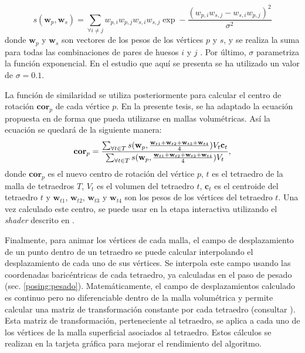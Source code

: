 \begin{equation}
\label{similarity}
 s(\textbf{w}_p,\textbf{w}_s) = 
\sum_{\forall i \neq j} w_{p,i}w_{p,j}w_{s,i}w_{s,j}\exp-\frac{(w_{p,i}w_{s,j}-w_{s,i}w_{p,j})^2}{\sigma^2}
\end{equation}
\normalsize
%
donde $\textbf{w}_p$ y $\textbf{w}_s$ son vectores de los pesos de los vértices $p$ y $s$, y se realiza la suma para todas las combinaciones de pares de huesos $i$ y $j$ . Por último, $\sigma$ parametriza la función exponencial. 
En el estudio que aquí se presenta se ha utilizado un valor de  $\sigma=0.1$. 

La función de similaridad se utiliza posteriormente para calcular el centro de rotación $\textbf{cor}_p$ de cada vértice $p$. En la presente tesis, se ha adaptado la ecuación  propuesta en \cite{le2016real} de forma que pueda utilizarse en mallas volumétricas. Así la ecuación se quedará de la siguiente manera: 
%
\begin{equation}
\textbf{cor}_p = 
\frac
  {
  \sum_{\forall t \in T}
    s(\textbf{w}_p,
      \frac{\textbf{w}_{t1}+\textbf{w}_{t2}+\textbf{w}_{t3}+\textbf{w}_{t4}}{4})
    V_t\mathbf{c}_t
  }
  {
  \sum_{\forall t \in T}
    s(\textbf{w}_p,
      \frac{\textbf{w}_{t1}+\textbf{w}_{t2}+\textbf{w}_{t3}+\textbf{w}_{t4}}{4})
    V_t
  } ,
\normalsize
\end{equation}
%
donde $\textbf{cor}_p$ es el nuevo centro de rotación del vértice $p$, $t$ es el tetraedro de la malla de tetraedros $T$, $V_t$ es el volumen del tetraedro $t$, $\textbf{c}_t$ es el centroide del tetraedro $t$ y $\textbf{w}_{t1}$, $\textbf{w}_{t2}$, $\textbf{w}_{t3}$ y $\textbf{w}_{t4}$ son los pesos de los vértices del tetraedro $t$. Una vez calculado este centro, se puede usar en la etapa interactiva utilizando el \emph{shader} descrito en \cite{le2016real}.

Finalmente, para animar los vértices de cada malla, el campo de desplazamiento de un punto dentro de un tetraedro se puede calcular interpolando el desplazamiento de cada uno de sus vértices. Se interpola este campo usando las coordenadas baricéntricas de cada tetraedro, ya calculadas en el paso de pesado (sec. \ref{posing:pesado}). Matemáticamente, el campo de desplazamientos calculado es continuo pero no diferenciable dentro de la malla volumétrica y permite calcular una matriz de transformación constante por cada tetraedro (consultar \cite{Muller2004}). Esta matriz de transformación, perteneciente al tetraedro, se aplica a cada uno de los vértices de la malla superficial asociados al tetraedro. Estos cálculos se realizan en la tarjeta gráfica para mejorar el rendimiento del algoritmo.

